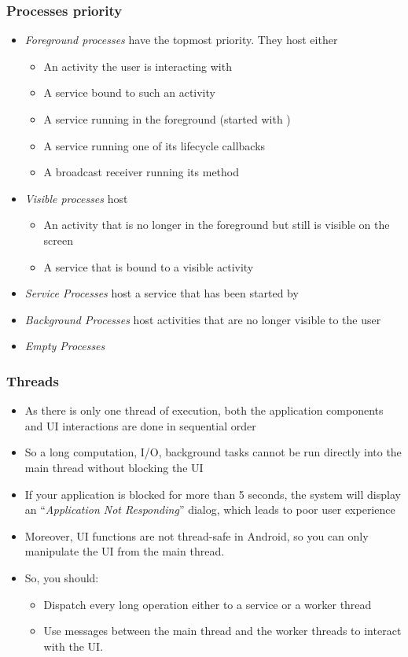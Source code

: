 \begin{frame}
  \frametitle{Processes priority}
  \begin{itemize}
  \item \emph{Foreground processes} have the topmost priority. They
    host either
    \begin{itemize}
    \item An activity the user is interacting with
    \item A service bound to such an activity
    \item A service running in the foreground (started with
      )
    \item A service running one of its lifecycle callbacks
    \item A broadcast receiver running its  method
    \end{itemize}
  \item \emph{Visible processes} host
    \begin{itemize}
    \item An activity that is no longer in the foreground but still is
      visible on the screen
    \item A service that is bound to a visible activity
    \end{itemize}
  \item \emph{Service Processes} host a service that has been started
    by 
  \item \emph{Background Processes} host activities that are no longer
    visible to the user
  \item \emph{Empty Processes}
  \end{itemize}
\end{frame}

\begin{frame}
  \frametitle{Threads}
  \begin{itemize}
  \item As there is only one thread of execution, both the application
    components and UI interactions are done in sequential order
  \item So a long computation, I/O, background tasks cannot be run
    directly into the main thread without blocking the UI
  \item If your application is blocked for more than 5 seconds, the
    system will display an ``\emph{Application Not Responding}''
    dialog, which leads to poor user experience
  \item Moreover, UI functions are not thread-safe in Android, so you
    can only manipulate the UI from the main thread.
  \item So, you should:
    \begin{itemize}
    \item Dispatch every long operation either to a service or a
      worker thread
    \item Use messages between the main thread and the worker threads
      to interact with the UI.
    \end{itemize}
  \end{itemize}
\end{frame}

